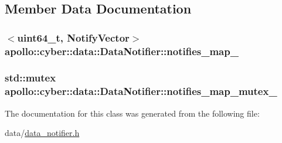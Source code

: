 \subsection{Member Data Documentation}
\hypertarget{classapollo_1_1cyber_1_1data_1_1DataNotifier_acbb98cccf2b075c3c455b9bc2b16013c}{
\subsubsection[{notifies\-\_\-map\-\_\-}]{$<$uint64\-\_\-t, {\bf Notify\-Vector}$>$ apollo\-::cyber\-::data\-::\-Data\-Notifier\-::notifies\-\_\-map\-\_\-\hspace{0.3cm}{\ttfamily [private]}}}\label{classapollo_1_1cyber_1_1data_1_1DataNotifier_acbb98cccf2b075c3c455b9bc2b16013c}
\hypertarget{classapollo_1_1cyber_1_1data_1_1DataNotifier_a6e73bd4fadc7ed461f4077ea905e50f6}{
\subsubsection[{notifies\-\_\-map\-\_\-mutex\-\_\-}]{\setlength{\rightskip}{0pt plus 5cm}std\-::mutex apollo\-::cyber\-::data\-::\-Data\-Notifier\-::notifies\-\_\-map\-\_\-mutex\-\_\-\hspace{0.3cm}{\ttfamily [private]}}}\label{classapollo_1_1cyber_1_1data_1_1DataNotifier_a6e73bd4fadc7ed461f4077ea905e50f6}


The documentation for this class was generated from the following file\-:\begin{DoxyCompactItemize}
\item 
data/\hyperlink{data__notifier_8h}{data\-\_\-notifier.\-h}\end{DoxyCompactItemize}
